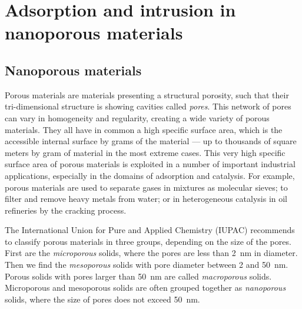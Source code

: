 \documentclass[thesis]{subfiles}
\begin{document}
\chapter{Adsorption and intrusion in nanoporous materials}

\section{Nanoporous materials}

Porous materials are materials presenting a structural porosity, such that their
tri-dimensional structure is showing cavities called \emph{pores}. This network
of pores can vary in homogeneity and regularity, creating a wide variety of
porous materials. They all have in common a high specific surface area, which is
the accessible internal surface by grams of the material --- up to thousands of
square meters by gram of material\cite{Farha2012} in the most extreme cases.
This very high specific surface area of porous materials is exploited in a
number of important industrial applications, especially in the domains of
adsorption and catalysis. For example, porous materials are used to separate
gases in mixtures as molecular sieves; to filter and remove heavy metals from
water; or in heterogeneous catalysis in oil refineries by the cracking process.

The International Union for Pure and Applied Chemistry (IUPAC) recommends to
classify porous materials in three groups, depending on the size of the
pores\cite{Rouquerol1994}. First are the \emph{microporous} solids, where the
pores are less than \SI{2}{nm} in diameter. Then we find the \emph{mesoporous}
solids with pore diameter between 2 and \SI{50}{nm}. Porous solids with pores
larger than \SI{50}{nm} are called \emph{macroporous} solids. Microporous and
mesoporous solids are often grouped together as \emph{nanoporous} solids, where
the size of pores does not exceed \SI{50}{nm}.
\end{document}
